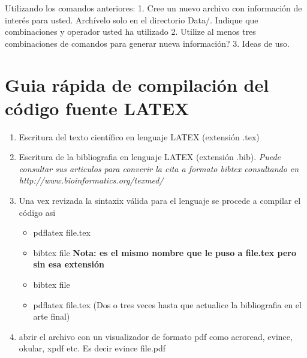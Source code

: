 \documentclass[10pt]{article}
\begin{document}
Utilizando los comandos anteriores:
1. Cree un nuevo archivo con información de interés para usted. Archívelo solo en el directorio Data/. Indique que combinaciones y operador usted ha utilizado
2. Utilize al menos tres combinaciones de comandos para generar nueva información? 
3. Ideas de uso.

\section{Guia rápida de compilación del código fuente LATEX}

\begin{enumerate}
\item Escritura del texto científico en lenguaje LATEX (extensión .tex)
\item Escritura de la bibliografia en lenguaje LATEX (extensión .bib). \textit{Puede consultar sus articulos para converir la cita a formato bibtex consultando en http://www.bioinformatics.org/texmed/}
\item Una vex revizada la sintaxix válida para el lenguaje se procede a compilar el código asi
\begin{itemize}
\item pdflatex file.tex
\item bibtex file  \textbf{Nota: es el mismo nombre que le puso a file.tex pero sin esa extensión}
\item bibtex file
\item pdflatex file.tex (Dos o tres veces hasta que actualice la bibliografia en el arte final)
\end{itemize}
\item abrir el archivo con un visualizador de formato pdf como acroread, evince, okular, xpdf etc. Es decir evince file.pdf
\end{enumerate}


\end{document}
